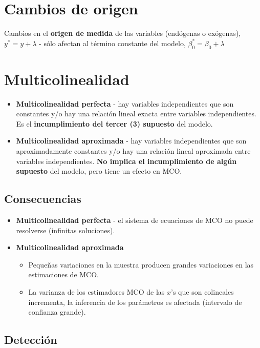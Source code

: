 \documentclass[10pt, a4paper, landscape]{extarticle}
\begin{document}
\begin{multicols}{3}
\section*{Cambios de origen}

Cambios en el \textbf{origen de medida} de las variables (endógenas o exógenas), $y^* = y + \lambda$ - sólo afectan al término constante del modelo, $\beta_0^* = \beta_0 + \lambda$

\columnbreak

\section*{Multicolinealidad}

\begin{itemize}[leftmargin=*]
	\item \textbf{Multicolinealidad perfecta} - hay variables independientes que son constantes y/o hay una relación lineal exacta entre variables independientes. Es el \textbf{incumplimiento del tercer (3) supuesto} del modelo.
	\item \textbf{Multicolinealidad aproximada} - hay variables independientes que son aproximadamente constantes y/o hay una relación lineal aproximada entre variables independientes. \textbf{No implica el incumplimiento de algún supuesto} del modelo, pero tiene un efecto en MCO.
\end{itemize}

\subsection*{Consecuencias}

\begin{itemize}[leftmargin=*]
	\item \textbf{Multicolinealidad perfecta} - el sistema de ecuaciones de MCO no puede resolverse (infinitas soluciones).
	\item \textbf{Multicolinealidad aproximada}
	\begin{itemize}[leftmargin=*]
		\item Pequeñas variaciones en la muestra producen grandes variaciones en las estimaciones de MCO.
		\item La varianza de los estimadores MCO de las $x$'s que son colineales incrementa, la inferencia de los parámetros es afectada (intervalo de confianza grande).
	\end{itemize}
\end{itemize}

\subsection*{Detección}


\end{multicols}
\end{document}
